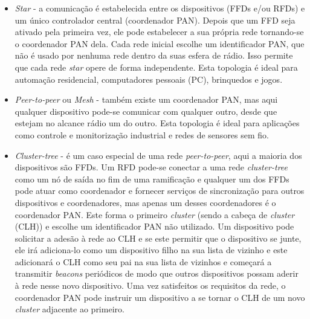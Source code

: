 \documentclass[conference]{IEEEtran}
\begin{document}
\begin{itemize}

 \item \textit{Star} - a comunicação é estabelecida entre os dispositivos (FFDs e/ou RFDs) e um único controlador central (coordenador PAN). Depois que um FFD seja ativado pela primeira vez, ele pode estabelecer a sua própria rede tornando-se o coordenador PAN dela. Cada rede inicial escolhe um identificador PAN, que não é usado por nenhuma rede dentro da suas esfera de rádio. Isso permite que cada rede \textit{star} opere de forma independente. Esta topologia é ideal para automação residencial, computadores pessoais (PC), brinquedos e jogos.
 
 \item \textit{Peer-to-peer} ou \textit{Mesh} - também existe um coordenador PAN, mas aqui qualquer dispositivo pode-se comunicar com qualquer outro, desde que estejam no alcance rádio um do outro. Esta topologia é ideal para aplicações como controle e monitorização industrial e redes de sensores sem fio. 
 
 \item \textit{Cluster-tree} - é um caso especial de uma rede \textit{peer-to-peer}, aqui a maioria dos dispositivos são FFDs. Um RFD pode-se conectar a uma rede \textit{cluster-tree} como um nó de saída no fim de uma ramificação e qualquer um dos FFDs pode atuar como coordenador e fornecer serviços de sincronização para outros dispositivos e coordenadores, mas apenas um desses coordenadores é o coordenador PAN. Este forma o primeiro \textit{cluster} (sendo a cabeça de \textit{cluster} (CLH)) e escolhe um identificador PAN não utilizado. Um dispositivo pode solicitar a adesão à rede ao CLH e se este permitir que o dispositivo se junte, ele irá adiciona-lo como um dispositivo filho na sua lista de vizinho e este adicionará o CLH como seu pai na sua lista de vizinhos e começará a transmitir \textit{beacons} periódicos de modo que outros dispositivos possam aderir à rede nesse novo dispositivo. Uma vez satisfeitos os requisitos da rede, o coordenador PAN pode instruir um dispositivo a se tornar o CLH de um novo \textit{cluster} adjacente ao primeiro. 

\end{itemize}


\end{document}
